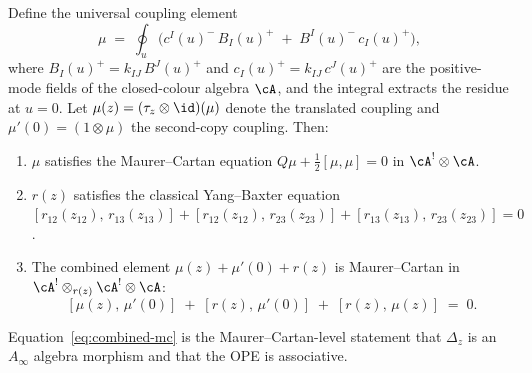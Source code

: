\begin{proposition}
\label{prop:mc-coproduct-verification}
Define the universal coupling element
\begin{equation}\label{eq:universal-coupling}
 \mu
 \;=\;
 \oint_u \bigl(
 c^I(u)^-\, B_I(u)^+
 \;+\;
 B^I(u)^-\, c_I(u)^+
 \bigr),
\end{equation}
where\/ $B_I(u)^+ = k_{IJ}\,B^J(u)^+$ and\/
$c_I(u)^+ = k_{IJ}\,c^J(u)^+$ are the positive-mode fields of
the closed-colour algebra\/ $\cA$, and the integral extracts the
residue at\/ $u = 0$. Let\/
$\mu(z) = (\tau_z \otimes \id)(\mu)$ denote the translated
coupling and\/ $\mu'(0) = (1 \otimes \mu)$ the second-copy
coupling. Then:
\begin{enumerate}[label=\textup{(\roman*)}]
\item $\mu$ satisfies the Maurer--Cartan equation\/
 $Q\mu + \tfrac{1}{2}[\mu, \mu] = 0$
 in\/ $\cA^! \otimes \cA$.
\item $r(z)$ satisfies the classical Yang--Baxter equation\/
 $[r_{12}(z_{12}),\, r_{13}(z_{13})]
 + [r_{12}(z_{12}),\, r_{23}(z_{23})]
 + [r_{13}(z_{13}),\, r_{23}(z_{23})] = 0$.
\item The combined element\/
 $\mu(z) + \mu'(0) + r(z)$
 is Maurer--Cartan in\/
 $\cA^! \otimes_{r(z)} \cA^! \otimes \cA$:
\begin{equation}\label{eq:combined-mc}
 [\mu(z),\, \mu'(0)]
 \;+\; [r(z),\, \mu'(0)]
 \;+\; [r(z),\, \mu(z)]
 \;=\; 0.
\end{equation}
\end{enumerate}
Equation~\eqref{eq:combined-mc} is the
Maurer--Cartan-level statement that\/ $\Delta_z$ is an\/
$A_\infty$ algebra morphism and that the OPE is associative.
\end{proposition}

